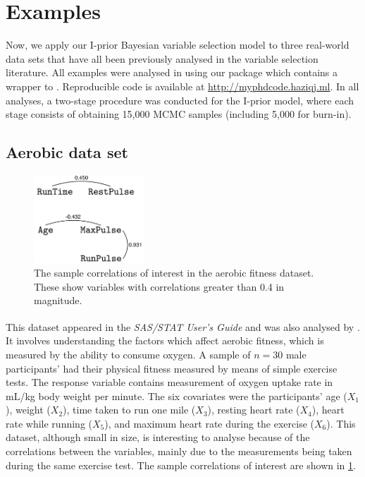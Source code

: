 \documentclass[11pt,twoside,openright]{report}
\begin{document}
\section{Examples}

Now, we apply our I-prior Bayesian variable selection model to three real-world data sets that have all been previously analysed in the variable selection literature.
All examples were analysed in  using our  package \citep{jamil2018ripriorBVS} which contains a wrapper to  \citep{plummer2003jags}.
Reproducible code is available at \url{http://myphdcode.haziqj.ml}.
In all analyses, a two-stage procedure was conducted for the I-prior model, where each stage consists of obtaining 15,000 MCMC samples (including 5,000 for burn-in).

\subsection{Aerobic data set}
\label{sec:aerobicbvs}

\begin{figure}[htb]
	\centering
	\includegraphics[height=1.3in]{figure/aerobic-cor}
	\caption[The sample correlations of interest in the aerobic fitness dataset]{The sample correlations of interest in the aerobic fitness dataset. These show variables with correlations greater than 0.4 in magnitude. \label{fig:aerobic-cor}}
\end{figure}

This dataset appeared in the \textit{SAS/STAT\textsuperscript{\textregistered} User's Guide} \citep{SAS2008} and was also analysed by \citet{Kuo1998}. 
It involves understanding the factors which affect aerobic fitness, which is measured by the ability to consume oxygen. 
A sample of $n=30$ male participants' had their physical fitness measured by means of simple exercise tests. 
The response variable contains measurement of oxygen uptake rate in mL/kg body weight per minute. 
The six covariates were the participants' age ($X_1$), weight ($X_2$), time taken to run one mile ($X_3$), resting heart rate ($X_4$), heart rate while running ($X_5$), and maximum heart rate during the exercise ($X_6$). 
This dataset, although small in size, is interesting to analyse because of the correlations between the variables, mainly due to the measurements being taken during the same exercise test. 
The sample correlations of interest are shown in \cref{fig:aerobic-cor}.
\end{document}
